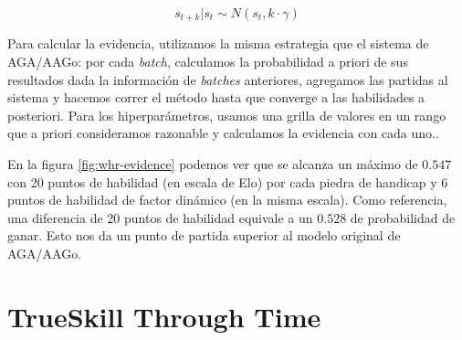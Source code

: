 \documentclass[a4paper,10pt]{report}
\begin{document}
\begin{equation}\label{eq:wiener}
	s_{t+k} | s_t \sim N(s_t, k \cdot \gamma)
\end{equation}

Para calcular la evidencia, utilizamos la misma estrategia que el sistema de AGA/AAGo: por cada \textit{batch}, calculamos la probabilidad a priori de sus resultados dada la información de \textit{batches} anteriores, agregamos las partidas al sistema y hacemos correr el método hasta que converge a las habilidades a posteriori.
Para los hiperparámetros, usamos una grilla de valores en un rango que a priori consideramos razonable y calculamos la evidencia con cada uno..

En la figura \ref{fig:whr-evidence} podemos ver que se alcanza un máximo de $0.547$ con 20 puntos de habilidad (en escala de Elo) por cada piedra de handicap y 6 puntos de habilidad de factor dinámico (en la misma escala).
Como referencia, una diferencia de 20 puntos de habilidad equivale a un $0.528$ de probabilidad de ganar.
Esto nos da un punto de partida superior al modelo original de AGA/AAGo.



\section*{TrueSkill Through Time}


\end{document}
